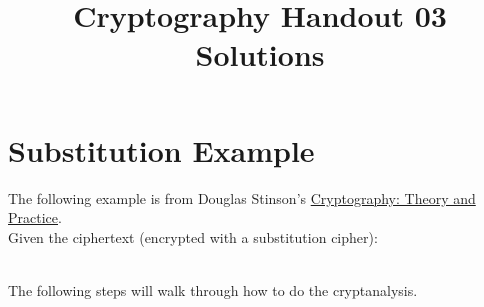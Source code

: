 \documentclass[12pt]{amsart}
\makeatletter
\def\subtitle#1{\gdef\@subtitle{#1}}
\def\@subtitle{}
\theoremstyle{plain}
\theoremstyle{definition}
\theoremstyle{remark}
\makeatother
\begin{document}
\onehalfspacing

\title[]{Cryptography Handout 03 Solutions}
\subtitle{Substitution Cipher}
\maketitle


\section*{Substitution Example}
The following example is from Douglas Stinson's \underline{Cryptography: Theory and Practice}.\\

Given the ciphertext (encrypted with a substitution cipher):

\\

The following steps will walk through how to do the cryptanalysis.\\
\end{document}
